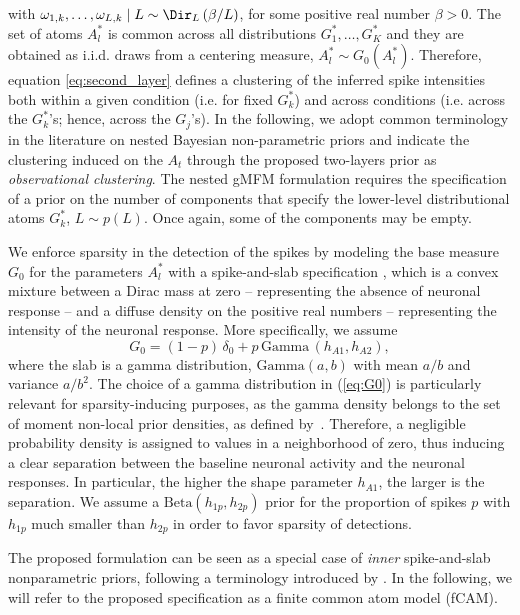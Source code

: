 with $\omega_{1,k},\dots,\omega_{L,k} \mid L\sim \Dir_L\left(\beta/L\right)$, for some positive real number $\beta>0$. The set of atoms $A_l^*$ is common across all distributions $G_1^*, \ldots, G_K^*$ and they are obtained as i.i.d. draws from a centering measure, \(A^*_l \sim G_0(A^*_l)\). Therefore, equation \eqref{eq:second_layer} defines a clustering of the inferred spike intensities both within a given condition (i.e. for fixed $G_k^*$) and across conditions (i.e. across the $G_k^*$'s; hence, across the $G_j$'s). In the following, we adopt common terminology in the literature on nested Bayesian non-parametric priors and indicate the clustering induced on the $A_t$ through the proposed two-layers prior as \textit{observational clustering}. The nested gMFM formulation requires the specification of a prior on the number of components that specify the lower-level distributional atoms $G_k^*$, \(L\sim p(L)\). Once again, some of the components may be empty. 

We enforce sparsity in the detection of the spikes by modeling the base measure $G_0$ for the parameters $A^*_{l}$ with a spike-and-slab specification \citep{mitchell1988}, which is a convex mixture between a Dirac mass at zero -- representing the absence of neuronal response -- and a diffuse density on the positive real numbers -- representing the intensity of the neuronal response. More specifically, we assume
\begin{equation}
G_0 = (1-p) \, \delta_0 + p\, \mathrm{Gamma}\,(h_{A1},h_{A2}),
\label{eq:G0}
\end{equation}
where the slab is a gamma distribution, $\mathrm{Gamma}(a,b)$ with mean $a/b$ and variance $a/b^2$. The choice of a gamma distribution in (\ref{eq:G0}) is particularly relevant for sparsity-inducing purposes, as the gamma density belongs to the set of moment non-local prior densities, as defined by~\citet{johnson2010}. Therefore, a negligible probability density is assigned to values in a neighborhood of zero, thus inducing a clear separation between the baseline neuronal activity and the neuronal responses. In particular, the higher the shape parameter $h_{A1}$, the larger is the separation. We assume a $ \mathrm{Beta}(h_{1p}, h_{2p})$ prior for the proportion of spikes $p$ with $h_{1p} $ much smaller than $h_{2p}$ in order to favor sparsity of detections.

The proposed formulation can be seen as a special case of \textit{inner} spike-and-slab nonparametric priors, following a terminology introduced by \citet{canale2017,spikeandslab2}. In the following, we will refer to the proposed specification as a finite common atom model (fCAM). 


